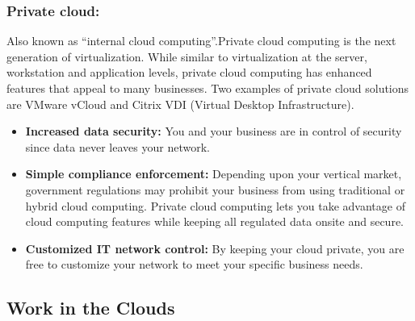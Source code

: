 \subsubsection {Private cloud:}

Also known as “internal cloud computing”.Private cloud computing is the next generation of virtualization. 
While similar to virtualization at the server, workstation and
application levels, private cloud computing has enhanced features that appeal to many businesses. 
Two examples of private cloud solutions are VMware vCloud and Citrix VDI (Virtual Desktop Infrastructure).


\begin {itemize}

 \item [•] \textbf{Increased data security:} You and your business are in control of security since data
never leaves your network.
 \item [•] \textbf {Simple compliance enforcement:} Depending upon your vertical market, government
regulations may prohibit your business from using traditional or hybrid cloud computing.
Private cloud computing lets you take advantage of cloud computing features while
keeping all regulated data onsite and secure.
 \item [•] \textbf {Customized IT network control:} By keeping your cloud private, you are free to
customize your network to meet your specific business needs.
\end {itemize}
% 
\subsection{Work in the Clouds}


